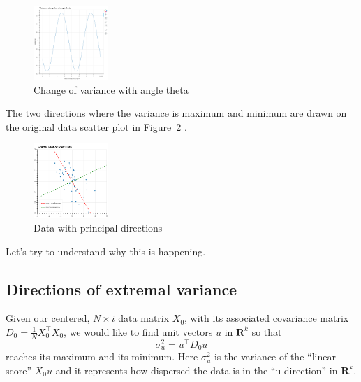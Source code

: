 \documentclass[
  11pt,
  letterpaper,
]{scrbook}
\theoremstyle{plain}
\theoremstyle{plain}
\theoremstyle{remark}
\begin{document}
\begin{figure}

{\centering \includegraphics[width=0.25\textwidth,height=\textheight]{chapters/img/PCAtheta.png}

}

\caption{\label{fig-pcatheta}Change of variance with angle theta}

\end{figure}

The two directions where the variance is maximum and minimum are drawn
on the original data scatter plot in Figure~\ref{fig-pcaprincipal} .

\begin{figure}

{\centering \includegraphics[width=0.25\textwidth,height=\textheight]{chapters/img/PCAprincipal.png}

}

\caption{\label{fig-pcaprincipal}Data with principal directions}

\end{figure}

Let's try to understand why this is happening.

\hypertarget{sec-extremalvariance}{%
\subsection{Directions of extremal
variance}\label{sec-extremalvariance}}

Given our centered, \(N\times i\) data matrix \(X_{0}\), with its
associated covariance matrix
\(D_{0}=\frac{1}{N}X_{0}^{\intercal}X_{0}\), we would like to find unit
vectors \(u\) in \(\mathbf{R}^{k}\) so that \[
\sigma_{u}^{2} = u^{\intercal}D_{0}u
\] reaches its maximum and its minimum. Here \(\sigma_{u}^2\) is the
variance of the ``linear score'' \(X_{0}u\) and it represents how
dispersed the data is in the ``u direction'' in \(\mathbf{R}^{k}\).
\end{document}
